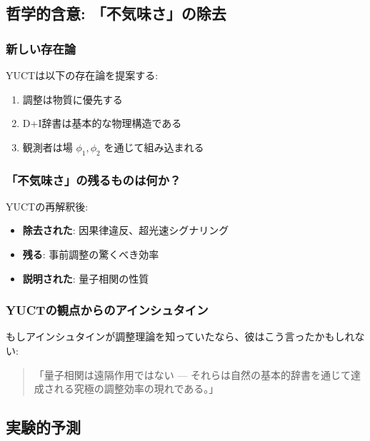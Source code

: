 \documentclass[11pt,a4paper]{article}
\begin{document}
	\subsection{哲学的含意: 「不気味さ」の除去}
	\label{subsec:philosophical}
	
	\subsubsection{新しい存在論}
	YUCTは以下の存在論を提案する:
	\begin{enumerate}
		\item 調整は物質に優先する
		\item D+I辞書は基本的な物理構造である
		\item 観測者は場 $\phi_1, \phi_2$ を通じて組み込まれる
	\end{enumerate}
	
	\subsubsection{「不気味さ」の残るものは何か？}
	YUCTの再解釈後:
	\begin{itemize}
		\item \textbf{除去された}: 因果律違反、超光速シグナリング
		\item \textbf{残る}: 事前調整の驚くべき効率
		\item \textbf{説明された}: 量子相関の性質
	\end{itemize}
	
	\subsubsection{YUCTの観点からのアインシュタイン}
	もしアインシュタインが調整理論を知っていたなら、彼はこう言ったかもしれない:
	
	\begin{quote}
		「量子相関は遠隔作用ではない — それらは自然の基本的辞書を通じて達成される究極の調整効率の現れである。」
	\end{quote}
	
	\subsection{実験的予測}
	\label{subsec:epr-experimental}
	
\end{document}
